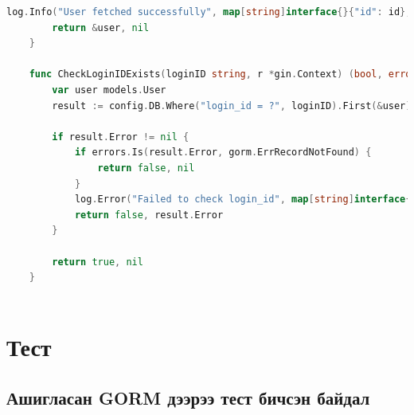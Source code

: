 \begin{lstlisting}[language=Go, frame=single]
		log.Info("User fetched successfully", map[string]interface{}{"id": id}, r)
		return &user, nil
	}
	
	func CheckLoginIDExists(loginID string, r *gin.Context) (bool, error) {
		var user models.User
		result := config.DB.Where("login_id = ?", loginID).First(&user)
	
		if result.Error != nil {
			if errors.Is(result.Error, gorm.ErrRecordNotFound) {
				return false, nil
			}
			log.Error("Failed to check login_id", map[string]interface{}{"error": result.Error.Error()}, r)
			return false, result.Error
		}
	
		return true, nil
	}
	
\end{lstlisting}

\section{Тест}
\subsection{Ашигласан GORM дээрээ тест бичсэн байдал}

